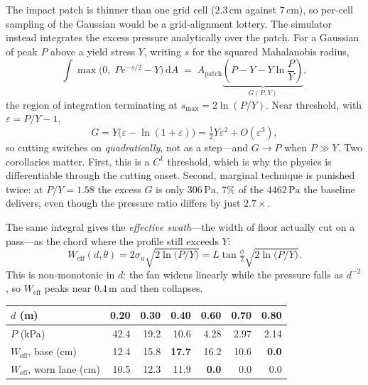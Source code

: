 \documentclass[11pt,a4paper]{article}
\newcommand{\SI}[2]{\ensuremath{#1\,#2}}
\newcommand{\metre}{\ensuremath{\mathrm{m}}}
\newcommand{\pascal}{\ensuremath{\mathrm{Pa}}}
\newcommand{\centi}{\ensuremath{\mathrm{c}}}
\begin{document}
The impact patch is thinner than one grid cell ($\SI{2.3}{\centi\metre}$ against
$\SI{7}{\centi\metre}$), so per-cell sampling of the Gaussian would be a
grid-alignment lottery. The simulator instead integrates the excess pressure
analytically over the patch. For a Gaussian of peak $P$ above a yield stress
$Y$, writing $s$ for the squared Mahalanobis radius,
\begin{equation}
  \int \max\bigl(0,\;P e^{-s/2}-Y\bigr)\,\mathrm{d}A
  \;=\; A_{\text{patch}}\underbrace{\left(P - Y - Y\ln\frac{P}{Y}\right)}_{\textstyle G(P,Y)},
\end{equation}
the region of integration terminating at $s_{\max}=2\ln(P/Y)$. Near threshold,
with $\varepsilon = P/Y - 1$,
\begin{equation}
  G = Y\bigl(\varepsilon - \ln(1+\varepsilon)\bigr) = \tfrac{1}{2}Y\varepsilon^{2} + O(\varepsilon^{3}),
\end{equation}
so cutting switches on \emph{quadratically}, not as a step---and $G\to P$ when
$P\gg Y$. Two corollaries matter. First, this is a $C^{1}$ threshold, which is
why the physics is differentiable through the cutting onset. Second, marginal
technique is punished twice: at $P/Y=1.58$ the excess $G$ is only
\SI{306}{\pascal}, $7\%$ of the \SI{4462}{\pascal} the baseline delivers, even
though the pressure ratio differs by just $2.7\times$.

The same integral gives the \emph{effective swath}---the width of floor actually
cut on a pass---as the chord where the profile still exceeds $Y$:
\begin{equation}
  W_{\text{eff}}(d,\theta) = 2\sigma_{u}\sqrt{2\ln\bigl(P/Y\bigr)}
  = L\tan\tfrac{\phi}{2}\sqrt{2\ln\bigl(P/Y\bigr)} .
\end{equation}
This is non-monotonic in $d$: the fan widens linearly while the pressure falls
as $d^{-2}$, so $W_{\text{eff}}$ peaks near \SI{0.4}{\metre} and then collapses.

\begin{center}
\begin{tabular}{lrrrrrr}
\toprule
$d$ (m) & 0.20 & 0.30 & 0.40 & 0.60 & 0.70 & 0.80 \\
\midrule
$P$ (kPa)                            & 42.4 & 19.2 & 10.6 & 4.28 & 2.97 & 2.14 \\
$W_{\text{eff}}$, base (cm)          & 12.4 & 15.8 & \textbf{17.7} & 16.2 & 10.6 & \textbf{0.0} \\
$W_{\text{eff}}$, worn lane (cm)     & 10.5 & 12.3 & 11.9 & \textbf{0.0} & 0.0 & 0.0 \\
\bottomrule
\end{tabular}
\end{center}
\end{document}

